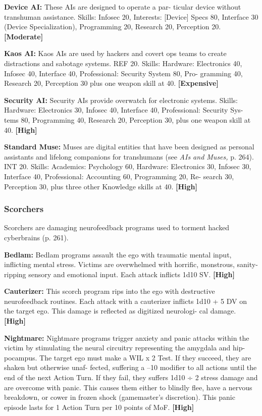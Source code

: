 \textbf{Device AI:} These AIs are designed to operate a par-
ticular device without transhuman assistance. Skills: 
Infosec 20, Interests: [Device] Specs 80, Interface 30 
(Device Specialization), Programming 20, Research 20, 
Perception 20. \textbf{[Moderate]}

\textbf{Kaos AI:} Kaos AIs are used by hackers and covert 
ops teams to create distractions and sabotage systems. 
REF 20. Skills: Hardware: Electronics 40, Infosec 40, 
Interface 40, Professional: Security System 80, Pro-
gramming 40, Research 20, Perception 30 plus one 
weapon skill at 40. \textbf{[Expensive]}

\textbf{Security AI:} Security AIs provide overwatch for 
electronic systems. Skills: Hardware: Electronics 30, 
Infosec 40, Interface 40, Professional: Security Sys-
tems 80, Programming 40, Research 20, Perception 
30, plus one weapon skill at 40. \textbf{[High]}

\textbf{Standard Muse:} Muses are digital entities that have 
been designed as personal assistants and lifelong 
companions for transhumans (see \textit{AIs and Muses,}
p. 264). INT 20. Skills: Academics: Psychology 60, 
Hardware: Electronics 30, Infosec 30, Interface 40, 
Professional: Accounting 60, Programming 20, Re-
search 30, Perception 30, plus three other Knowledge 
skills at 40. \textbf{[High]}

\subsubsection{Scorchers}

Scorchers are damaging neurofeedback programs used 
to torment hacked cyberbrains (p. 261).

\textbf{Bedlam:} Bedlam programs assault the ego with 
traumatic mental input, inflicting mental stress. 
Victims are overwhelmed with horrific,  monstrous, 
sanity-ripping sensory and emotional input. Each 
attack inflicts 1d10 SV. \textbf{[High]}

\textbf{Cauterizer:} This scorch program rips into the ego 
with destructive neurofeedback routines. Each attack 
with a cauterizer inflicts 1d10 + 5 DV on the target 
ego. This damage is reflected as digitized neurologi-
cal damage. \textbf{[High]}

\textbf{Nightmare:} Nightmare programs trigger anxiety 
and panic attacks within the victim by stimulating the 
neural circuitry representing the amygdala and hip-
pocampus. The target ego must make a WIL x 2 Test. 
If they succeed, they are shaken but otherwise unaf-
fected, suffering a –10 modifier to all actions until the 
end of the next Action Turn. If they fail, they suffers 
1d10 ÷ 2 stress damage and are overcome with panic. 
This causes them either to blindly flee, have a nervous 
breakdown, or cower in frozen shock (gamemaster's 
discretion). This panic episode lasts for 1 Action Turn 
per 10 points of MoF. \textbf{[High]}

